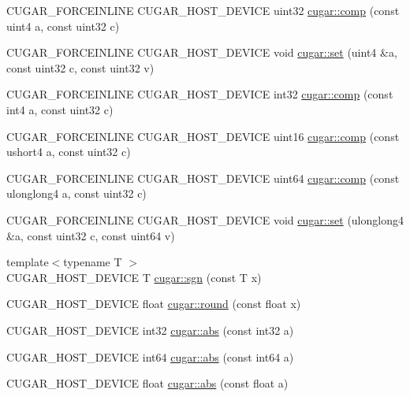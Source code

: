 \begin{DoxyCompactItemize}
\item 
C\+U\+G\+A\+R\+\_\+\+F\+O\+R\+C\+E\+I\+N\+L\+I\+NE C\+U\+G\+A\+R\+\_\+\+H\+O\+S\+T\+\_\+\+D\+E\+V\+I\+CE uint32 \hyperlink{group___basic_ga5545f19d89c4e61611468d6bd1060a0f}{cugar\+::comp} (const uint4 a, const uint32 c)
\item 
C\+U\+G\+A\+R\+\_\+\+F\+O\+R\+C\+E\+I\+N\+L\+I\+NE C\+U\+G\+A\+R\+\_\+\+H\+O\+S\+T\+\_\+\+D\+E\+V\+I\+CE void \hyperlink{group___basic_ga02d9003c4a4c31d671a38739bdbd223b}{cugar\+::set} (uint4 \&a, const uint32 c, const uint32 v)
\item 
C\+U\+G\+A\+R\+\_\+\+F\+O\+R\+C\+E\+I\+N\+L\+I\+NE C\+U\+G\+A\+R\+\_\+\+H\+O\+S\+T\+\_\+\+D\+E\+V\+I\+CE int32 \hyperlink{group___basic_gaae11b617c4d4f21b97ed354dbe09d947}{cugar\+::comp} (const int4 a, const uint32 c)
\item 
C\+U\+G\+A\+R\+\_\+\+F\+O\+R\+C\+E\+I\+N\+L\+I\+NE C\+U\+G\+A\+R\+\_\+\+H\+O\+S\+T\+\_\+\+D\+E\+V\+I\+CE uint16 \hyperlink{group___basic_ga2d4381782c0e35e5b62cad80edbadb97}{cugar\+::comp} (const ushort4 a, const uint32 c)
\item 
C\+U\+G\+A\+R\+\_\+\+F\+O\+R\+C\+E\+I\+N\+L\+I\+NE C\+U\+G\+A\+R\+\_\+\+H\+O\+S\+T\+\_\+\+D\+E\+V\+I\+CE uint64 \hyperlink{group___basic_ga47d97ac7d761e3b3764fedb8bab6ad8d}{cugar\+::comp} (const ulonglong4 a, const uint32 c)
\item 
C\+U\+G\+A\+R\+\_\+\+F\+O\+R\+C\+E\+I\+N\+L\+I\+NE C\+U\+G\+A\+R\+\_\+\+H\+O\+S\+T\+\_\+\+D\+E\+V\+I\+CE void \hyperlink{group___basic_gac0bd2f6d0e83bfeddcd301d63e0bc750}{cugar\+::set} (ulonglong4 \&a, const uint32 c, const uint64 v)
\item 
{\footnotesize template$<$typename T $>$ }\\C\+U\+G\+A\+R\+\_\+\+H\+O\+S\+T\+\_\+\+D\+E\+V\+I\+CE T \hyperlink{group___basic_gaf4597603074c709d435ea876eac59e1b}{cugar\+::sgn} (const T x)
\item 
C\+U\+G\+A\+R\+\_\+\+H\+O\+S\+T\+\_\+\+D\+E\+V\+I\+CE float \hyperlink{group___basic_gaea9bbfe8e98f49d1754e26b52b37f9e2}{cugar\+::round} (const float x)
\item 
C\+U\+G\+A\+R\+\_\+\+H\+O\+S\+T\+\_\+\+D\+E\+V\+I\+CE int32 \hyperlink{group___basic_gafc4cc49011584e022dbf9c13fa7b95ee}{cugar\+::abs} (const int32 a)
\item 
C\+U\+G\+A\+R\+\_\+\+H\+O\+S\+T\+\_\+\+D\+E\+V\+I\+CE int64 \hyperlink{group___basic_gad4c63fa8a391708719f2a5dff73fa25a}{cugar\+::abs} (const int64 a)
\item 
C\+U\+G\+A\+R\+\_\+\+H\+O\+S\+T\+\_\+\+D\+E\+V\+I\+CE float \hyperlink{group___basic_gaa2016bab6ca9f9043a7251b64daa0941}{cugar\+::abs} (const float a)

\end{DoxyCompactItemize}

